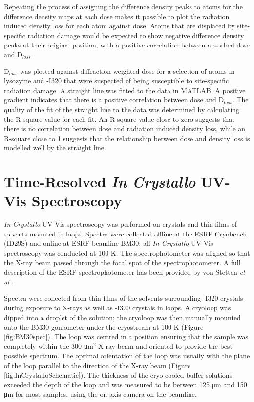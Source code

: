 Repeating the process of assigning the difference density peaks to atoms for the difference density maps at each dose makes it possible to plot the radiation induced density loss for each atom against dose. Atoms that are displaced by site-specific radiation damage would be expected to show negative difference density peaks at their original position, with a positive correlation between absorbed dose and D$_{loss}$.

D$_{loss}$ was plotted against diffraction weighted dose for a selection of atoms in lysozyme and \atpdx -I320 that were suspected of being susceptible to site-specific radiation damage. A straight line was fitted to the data in MATLAB. A positive gradient indicates that there is a positive correlation between dose and D$_{loss}$. The quality of the fit of the straight line to the data was determined by calculating the R-square value for each fit. An R-square value close to zero suggests that there is no correlation between dose and radiation induced density loss, while an R-square close to 1 suggests that the relationship between dose and density loss is modelled well by the straight line.      
          
 \clearpage
\section{Time-Resolved \textit{In Crystallo} UV-Vis Spectroscopy}		
\textit{In Crystallo} UV-Vis spectroscopy was performed on crystals and thin films of solvents mounted in loops. Spectra were collected offline at the ESRF Cryobench (ID29S) and online at ESRF beamline BM30; all \textit{In Crystallo} UV-Vis spectroscopy was conducted at 100 K. The spectrophotometer was aligned so that the X-ray beam passed through the focal spot of the spectrophotometer. A full description of the ESRF spectrophotometer has been provided by von Stetten \textit{et al} \cite{vonStetten2015}.    

Spectra were collected from thin films of the solvents surrounding \atpdx-I320 crystals during exposure to X-rays as well as \atpdx-I320 crystals in loops. A cryoloop was dipped into a droplet of the solution; the cryoloop was then manually mounted onto the BM30 goniometer under the cryostream at 100 K (Figure \ref{fig:BM30spec}). The loop was centred in a position ensuring that the sample was completely within the 300 \si{\micro\meter}$^2$ X-ray beam and oriented to provide the best possible spectrum. The optimal orientation of the loop was usually with the plane of the loop parallel to the direction of the X-ray beam (Figure \ref{fig:InCrystalloSchematic}). The thickness of the cryo-cooled buffer solutions exceeded the depth of the loop and was measured to be between 125 \si{\micro\meter} and 150 \si{\micro\meter} for most samples, using the on-axis camera on the beamline.   

